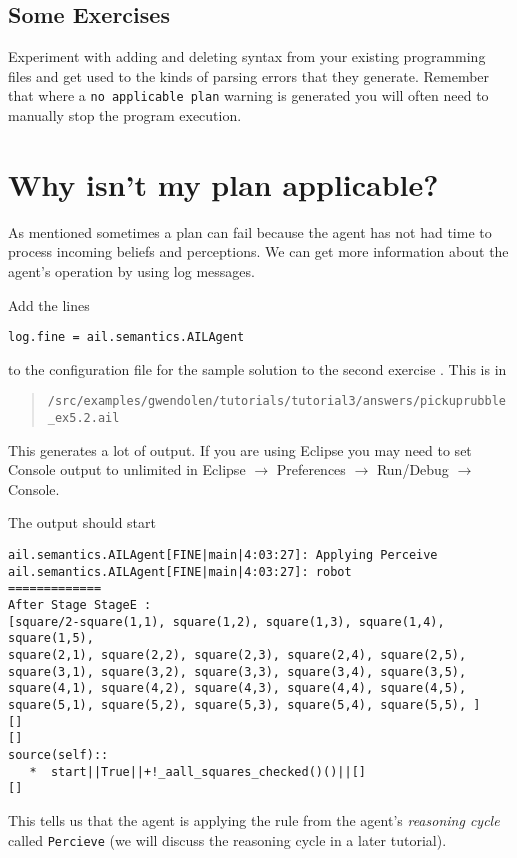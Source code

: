 \subsection{Some
  Exercises} 
Experiment with adding and deleting syntax from your existing
programming files and get used to the kinds of parsing errors that
they generate.  Remember that where a \texttt{no applicable plan}
warning is generated you will often need to manually stop the program
execution. 

\section{Why isn't my plan applicable?}

As mentioned 
sometimes a plan can fail because the agent has not had time to
process incoming beliefs and perceptions.  We can get more information
about the agent's operation by using log
messages. 

Add the lines
\begin{verbatim}
log.fine = ail.semantics.AILAgent
\end{verbatim}
to the configuration file for the sample solution to the second exercise .  This is in
\begin{quote}
\texttt{/src/examples/gwendolen/tutorials/tutorial3/answers/pickuprubble\_ex5.2.ail}
\end{quote}
This generates a lot of output.  If you are using Eclipse you may need
to set Console output to unlimited in Eclipse $\rightarrow$
Preferences $\rightarrow$ Run/Debug $\rightarrow$
Console. 

The output should start
\begin{verbatim}
ail.semantics.AILAgent[FINE|main|4:03:27]: Applying Perceive 
ail.semantics.AILAgent[FINE|main|4:03:27]: robot
=============
After Stage StageE :
[square/2-square(1,1), square(1,2), square(1,3), square(1,4), square(1,5), 
square(2,1), square(2,2), square(2,3), square(2,4), square(2,5), 
square(3,1), square(3,2), square(3,3), square(3,4), square(3,5), 
square(4,1), square(4,2), square(4,3), square(4,4), square(4,5), 
square(5,1), square(5,2), square(5,3), square(5,4), square(5,5), ]
[]
[]
source(self):: 
   *  start||True||+!_aall_squares_checked()()||[]
[] 
\end{verbatim}
This tells us that the agent is applying the rule from the agent's
\emph{reasoning cycle} called
\texttt{Percieve} (we will discuss the
reasoning cycle in a later tutorial). 

